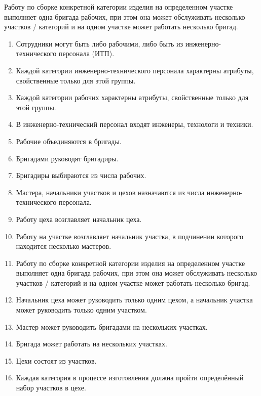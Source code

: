 Работу по сборке конкретной категории изделия на определенном участке выполняет одна бригада рабочих, при этом она может обслуживать несколько участков / категорий и на одном участке может работать несколько бригад.

\begin{enumerate}

    \item Сотрудники могут быть либо рабочими, либо быть из инженерно-технического персонала (ИТП).
    \item Каждой категории инженерно-технического персонала характерны атрибуты, свойственные только для этой группы.
    \item Каждой категории рабочих характерны атрибуты, свойственные только для этой группы.
    \item В инженерно-технический персонал входят инженеры, технологи и техники.
    \item Рабочие объединяются в бригады.
    \item Бригадами руководят бригадиры.
    \item Бригадиры выбираются из числа рабочих.
    \item Мастера, начальники участков и цехов назначаются из числа инженерно-технического персонала.
    \item Работу цеха возглавляет начальник цеха.
    \item Работу на участке возглавляет начальник участка, в подчинении которого находится несколько мастеров.
    \item Работу по сборке конкретной категории изделия на определенном участке выполняет одна бригада рабочих, при этом она может обслуживать несколько участков / категорий и на одном участке может работать несколько бригад.
    \item Начальник цеха может руководить только одним цехом, а начальник участка может руководить только одним участком.
    \item Мастер может руководить бригадами на нескольких участках.
    \item Бригада может работать на нескольких участках.
    \item Цехи состоят из участков.
    \item Каждая категория в процессе изготовления должна пройти определённый набор участков в цехе.


\end{enumerate}

